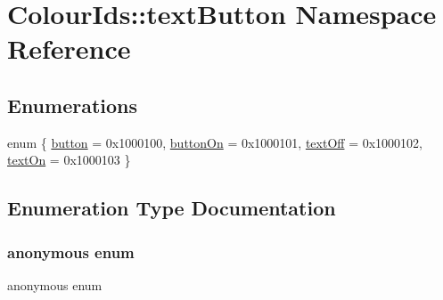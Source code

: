 \hypertarget{namespaceColourIds_1_1textButton}{}\section{Colour\+Ids\+:\+:text\+Button Namespace Reference}
\label{namespaceColourIds_1_1textButton}
\subsection*{Enumerations}
\begin{DoxyCompactItemize}
\item 
enum \{ \mbox{\hyperlink{namespaceColourIds_1_1textButton_ac5079731968acb377134f66144b569ffa50d56437fc4163b58974815f52b61791}{button}} = 0x1000100, 
\mbox{\hyperlink{namespaceColourIds_1_1textButton_ac5079731968acb377134f66144b569ffaaa9762aa0cd5cb0b21e5519ef28ca104}{button\+On}} = 0x1000101, 
\mbox{\hyperlink{namespaceColourIds_1_1textButton_ac5079731968acb377134f66144b569ffa91736172ad0035a05752648a02e31818}{text\+Off}} = 0x1000102, 
\mbox{\hyperlink{namespaceColourIds_1_1textButton_ac5079731968acb377134f66144b569ffaa2355896c8f763613b1fca54771f1a90}{text\+On}} = 0x1000103
 \}
\end{DoxyCompactItemize}


\subsection{Enumeration Type Documentation}
\mbox{\label{namespaceColourIds_1_1textButton_ac5079731968acb377134f66144b569ff}} 
\subsubsection{\texorpdfstring{anonymous enum}{anonymous enum}}
{\footnotesize\ttfamily anonymous enum}

